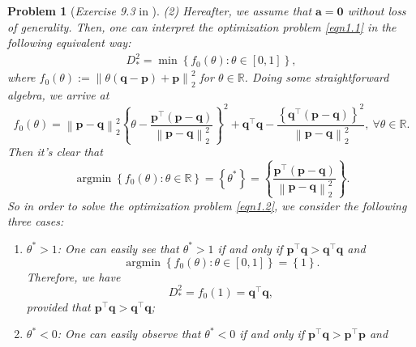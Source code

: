 \documentclass[11pt]{article}
\newtheorem{problem}{Problem}
\DeclareMathOperator*{\argmin}{argmin}
\numberwithin{equation}{problem}
\begin{document}
\begin{problem} [\emph{Exercise 9.3} in \cite{calafiore2014optimization}]
{\indent (2) Hereafter, we assume that $\mathbf{a} = \mathbf{0}$ without loss of generality. Then, one can interpret the optimization problem \eqref{eqn1.1} in the following equivalent way:
\begin{equation}
    \label{eqn1.2}
    \begin{split}
        D_{*}^2 = \min \left\{ f_0 (\theta) : \theta \in [0, 1] \right\},
    \end{split}
\end{equation}
where $f_0 (\theta) := \left\| \theta \left( \mathbf{q} - \mathbf{p} \right) + \mathbf{p} \right\|_{2}^2$ for $\theta \in \mathbb{R}$. Doing some straightforward algebra, we arrive at
\begin{equation*}
    f_0 (\theta) = \left\| \mathbf{p} - \mathbf{q} \right\|_{2}^2 \left\{ \theta - \frac{\mathbf{p}^{\top} \left( \mathbf{p} - \mathbf{q} \right)}{\left\| \mathbf{p} - \mathbf{q} \right\|_{2}^2} \right\}^2 +
    \mathbf{q}^{\top} \mathbf{q} - \frac{\left\{ \mathbf{q}^{\top} \left( \mathbf{p} - \mathbf{q} \right) \right\}^2}{\left\| \mathbf{p} - \mathbf{q} \right\|_{2}^2},\ \forall \theta \in \mathbb{R}.
\end{equation*}
Then it's clear that
\begin{equation*}
    \argmin \left\{ f_0 (\theta) : \theta \in \mathbb{R} \right\} = \left\{ \theta^* \right\}
    = \left\{ \frac{\mathbf{p}^{\top} \left( \mathbf{p} - \mathbf{q} \right)}{\left\| \mathbf{p} - \mathbf{q} \right\|_{2}^2} \right\}.
\end{equation*}
So in order to solve the optimization problem \eqref{eqn1.2}, we consider the following three cases:
\begin{enumerate} [label=(\roman*)]
    \item $\theta^* > 1$: One can easily see that $\theta^* > 1$ if and only if $\mathbf{p}^{\top} \mathbf{q} > \mathbf{q}^{\top} \mathbf{q}$ and
    \begin{equation}
        \label{eqn1.3}
        \argmin \left\{ f_0 (\theta) : \theta \in [0, 1] \right\} = \left\{ 1 \right\}.
    \end{equation}
    Therefore, we have
    \begin{equation}
        \label{eqn1.4}
        D_{*}^2 = f_0 (1) = \mathbf{q}^{\top} \mathbf{q},
    \end{equation}
    provided that $\mathbf{p}^{\top} \mathbf{q} > \mathbf{q}^{\top} \mathbf{q}$;
    \item $\theta^* < 0$: One can easily observe that $\theta^* < 0$ if and only if $\mathbf{p}^{\top} \mathbf{q} > \mathbf{p}^{\top} \mathbf{p}$ and

\end{enumerate}}
\end{problem}
\end{document}
